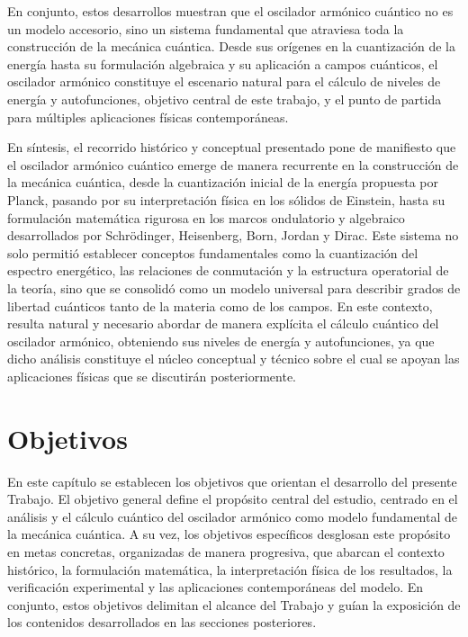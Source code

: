 \documentclass[11pt,a4paper,spanish]{book}
\begin{document}
En conjunto, estos desarrollos muestran que el oscilador armónico cuántico no es un modelo accesorio, sino un sistema fundamental que atraviesa toda la construcción de la mecánica cuántica. Desde sus orígenes en la cuantización de la energía hasta su formulación algebraica y su aplicación a campos cuánticos, el oscilador armónico constituye el escenario natural para el cálculo de niveles de energía y autofunciones, objetivo central de este trabajo, y el punto de partida para múltiples aplicaciones físicas contemporáneas.

En síntesis, el recorrido histórico y conceptual presentado pone de manifiesto que el oscilador armónico cuántico emerge de manera recurrente en la construcción de la mecánica cuántica, desde la cuantización inicial de la energía propuesta por Planck, pasando por su interpretación física en los sólidos de Einstein, hasta su formulación matemática rigurosa en los marcos ondulatorio y algebraico desarrollados por Schrödinger, Heisenberg, Born, Jordan y Dirac. Este sistema no solo permitió establecer conceptos fundamentales como la cuantización del espectro energético, las relaciones de conmutación y la estructura operatorial de la teoría, sino que se consolidó como un modelo universal para describir grados de libertad cuánticos tanto de la materia como de los campos. En este contexto, resulta natural y necesario abordar de manera explícita el cálculo cuántico del oscilador armónico, obteniendo sus niveles de energía y autofunciones, ya que dicho análisis constituye el núcleo conceptual y técnico sobre el cual se apoyan las aplicaciones físicas que se discutirán posteriormente.




\chapter{Objetivos}

En este capítulo se establecen los objetivos que orientan el desarrollo del presente Trabajo. El objetivo general define el propósito central del estudio, centrado en el análisis y el cálculo cuántico del oscilador armónico como modelo fundamental de la mecánica cuántica. A su vez, los objetivos específicos desglosan este propósito en metas concretas, organizadas de manera progresiva, que abarcan el contexto histórico, la formulación matemática, la interpretación física de los resultados, la verificación experimental y las aplicaciones contemporáneas del modelo. En conjunto, estos objetivos delimitan el alcance del Trabajo y guían la exposición de los contenidos desarrollados en las secciones posteriores.
\end{document}
